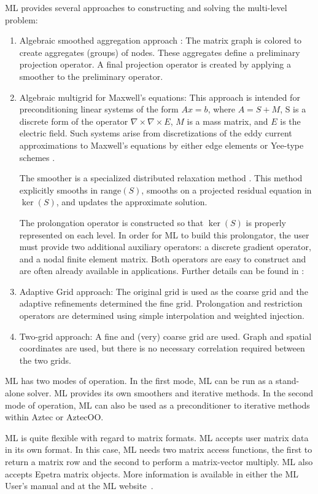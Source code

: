 \documentclass[12pt,relax]{TrilinosOverview}
\begin{document}
ML provides several approaches to constructing and solving the multi-level
problem:
\begin{enumerate}
\item Algebraic smoothed aggregation approach \cite{Vanek:96,Vanek:98}:  The
 matrix graph is colored to create aggregates (groups) of nodes.
These aggregates define a preliminary projection operator.
A final projection operator is created by applying a smoother to the
 preliminary operator.
%
\item Algebraic multigrid for Maxwell's equations:
 This approach is
intended for preconditioning linear systems of the form $Ax=b$, where $A=S+M$,
S is a discrete form of the operator $\nabla\times\nabla\times E$,
 $M$ is a mass matrix, and $E$ is the electric field.
Such systems arise from discretizations of the eddy current approximations to
Maxwell's equations by either edge elements or Yee-type schemes
\cite{Bochev:03a,Yee:66}.

The smoother is a specialized distributed relaxation method \cite{Bochev:03a}.
This method explicitly smooths in $\mbox{range}(S)$, smooths on a projected
 residual
equation in $\ker(S)$, and updates the approximate solution.

The prolongation operator is constructed so that $\ker(S)$ is properly
 represented on each level.
In order for ML to build this prolongator, the user must provide two
additional auxiliary operators: a discrete gradient operator, and a nodal
 finite element matrix.
Both operators are easy to construct and are often already available in
 applications.
Further details can be found in \cite{Bochev:03a,Bochev:03b}:
%
\item Adaptive Grid approach: The original grid is used as the coarse grid and
the adaptive refinements determined the fine grid.
Prolongation and restriction operators are determined using simple interpolation
and weighted injection.
%
\item Two-grid approach: A fine and (very) coarse grid are used.
Graph and spatial coordinates are used, 
but there is no necessary correlation required between the two grids.
\end{enumerate}

ML has two modes of operation.
In the first mode, ML can be run as a stand-alone solver.
ML provides its own smoothers and iterative methods.
In the second mode of operation,
ML can also be used as a preconditioner to iterative methods within Aztec
 or AztecOO.

ML is quite flexible with regard to matrix formats.
ML accepts user matrix data in its own format.
In this case, ML needs two matrix access functions, the first to return
a matrix row and the second to perform a matrix-vector multiply.
ML also accepts Epetra matrix objects.
More information is available in either the ML User's manual
\cite{TuminaroTong:00a} and at the ML website~\cite{ML-home-page}.
\end{document}
